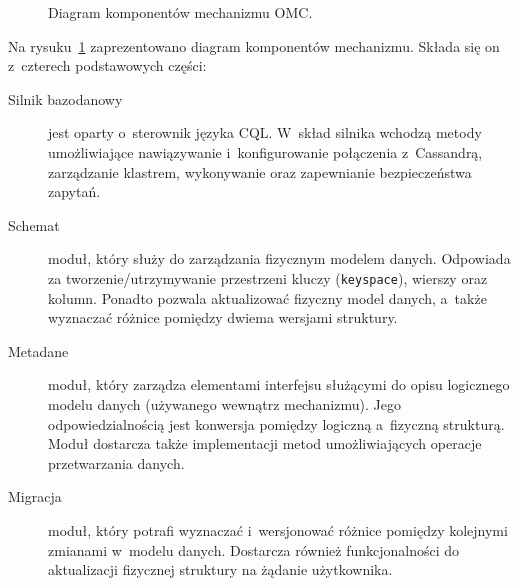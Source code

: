 \begin{figure}[ht!]
	\centering
	\caption{Diagram komponentów mechanizmu OMC.}
	\label{fig:omc_components}
\end{figure}

Na rysuku~\ref{fig:omc_components} zaprezentowano diagram komponentów mechanizmu. Składa się on z~czterech podstawowych części:

\begin{description}
	\item[Silnik bazodanowy] jest oparty o~sterownik języka CQL. W~skład silnika wchodzą metody umożliwiające nawiązywanie i~konfigurowanie połączenia z~Cassandrą, zarządzanie klastrem, wykonywanie oraz zapewnianie bezpieczeństwa zapytań.
	\item[Schemat] moduł, który służy do zarządzania fizycznym modelem danych. Odpowiada za tworzenie/utrzymywanie przestrzeni kluczy (\verb+keyspace+), wierszy oraz kolumn. Ponadto pozwala aktualizować fizyczny model danych, a~także wyznaczać różnice pomiędzy dwiema wersjami struktury.
	\item[Metadane] moduł, który zarządza elementami interfejsu służącymi do opisu logicznego modelu danych (używanego wewnątrz mechanizmu). Jego odpowiedzialnością jest konwersja pomiędzy logiczną a~fizyczną strukturą. Moduł dostarcza także implementacji metod umożliwiających operacje przetwarzania danych.
	\item[Migracja] moduł, który potrafi wyznaczać i~wersjonować różnice pomiędzy kolejnymi zmianami w~modelu danych. Dostarcza również funkcjonalności do aktualizacji fizycznej struktury na żądanie użytkownika.
\end{description}

